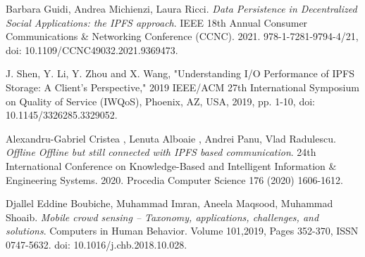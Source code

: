 \documentclass[]{llncs}
\begin{document}
\begin{thebibliography}{8}
 Barbara Guidi, Andrea Michienzi, Laura Ricci. \textit{Data Persistence in Decentralized Social Applications: the IPFS approach}. IEEE 18th Annual Consumer Communications \& Networking Conference (CCNC). 2021. 978-1-7281-9794-4/21, doi: 10.1109/CCNC49032.2021.9369473.

J. Shen, Y. Li, Y. Zhou and X. Wang, "Understanding I/O Performance of IPFS Storage: A Client's Perspective," 2019 IEEE/ACM 27th International Symposium on Quality of Service (IWQoS), Phoenix, AZ, USA, 2019, pp. 1-10, doi: 10.1145/3326285.3329052.

 Alexandru-Gabriel Cristea , Lenuta Alboaie , Andrei Panu, Vlad Radulescu. \textit{Offline Offline but still connected with IPFS based communication}. 24th International Conference on Knowledge-Based and Intelligent Information \& Engineering Systems. 2020. Procedia Computer Science 176 (2020) 1606-1612.

 Djallel Eddine Boubiche, Muhammad Imran, Aneela Maqsood, Muhammad Shoaib. \textit{Mobile crowd sensing – Taxonomy, applications, challenges, and solutions}. Computers in Human Behavior. Volume 101,2019, Pages 352-370, ISSN 0747-5632. doi: 10.1016/j.chb.2018.10.028.

\end{thebibliography}
\end{document}

